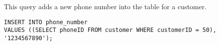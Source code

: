 This query adds a new phone number into the table for a customer.

\begin{lstlisting}
INSERT INTO phone_number
VALUES ((SELECT phoneID FROM customer WHERE customerID = 50), '1234567890');
\end{lstlisting}